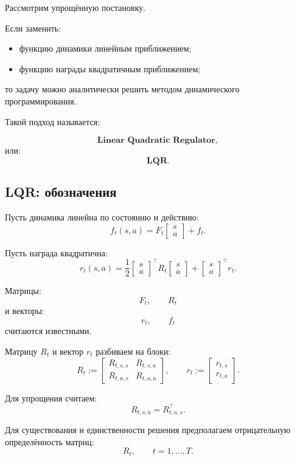 \documentclass[12pt,a4paper]{article}
\begin{document}
Рассмотрим упрощённую постановку.

Если заменить:

\begin{itemize}
    \item функцию динамики линейным приближением;
    \item функцию награды квадратичным приближением;
\end{itemize}

то задачу можно аналитически решить методом динамического программирования.

Такой подход называется:

\[
\textbf{Linear Quadratic Regulator},
\]
или:
\[
\textbf{LQR}.
\]

\subsection{LQR: обозначения}

Пусть динамика линейна по состоянию и действию:
\[
f_t(s,a)
=
F_t
\begin{bmatrix}
s\\
a
\end{bmatrix}
+
f_t.
\]

Пусть награда квадратична:
\[
r_t(s,a)
=
\frac{1}{2}
\begin{bmatrix}
s\\
a
\end{bmatrix}^{\top}
R_t
\begin{bmatrix}
s\\
a
\end{bmatrix}
+
\begin{bmatrix}
s\\
a
\end{bmatrix}^{\top}
r_t.
\]

Матрицы:
\[
F_t,
\qquad
R_t
\]
и векторы:
\[
r_t,
\qquad
f_t
\]
считаются известными.

Матрицу $R_t$ и вектор $r_t$ разбиваем на блоки:
\[
R_t
:=
\begin{bmatrix}
R_{t,s,s} & R_{t,s,a}\\
R_{t,a,s} & R_{t,a,a}
\end{bmatrix},
\qquad
r_t
:=
\begin{bmatrix}
r_{t,s}\\
r_{t,a}
\end{bmatrix}.
\]

Для упрощения считаем:
\[
R_{t,s,a}
=
R_{t,a,s}^{\top}.
\]

Для существования и единственности решения предполагаем отрицательную определённость матриц:
\[
R_t,
\qquad
t=1,\ldots,T.
\]
\end{document}
